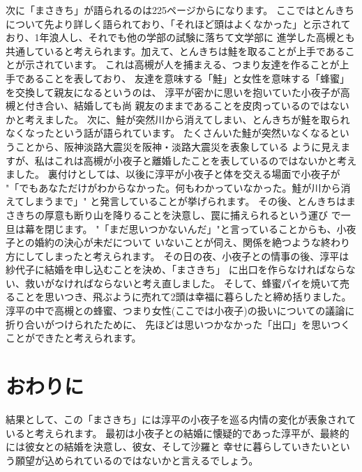 \documentclass[12pt,a4paper]{jsarticle}
\numberwithin{equation}{section}
\numberwithin{figure}{section}
\numberwithin{table}{section}
\begin{document}
次に「まさきち」が語られるのは225ページからになります。
ここではとんきちについて先より詳しく語られており、「それほど頭はよくなかった」と示されており、1年浪人し、それでも他の学部の試験に落ちて文学部に
進学した高槻とも共通していると考えられます。加えて、とんきちは鮭を取ることが上手であることが示されています。
これは高槻が人を捕まえる、つまり友達を作ることが上手であることを表しており、
友達を意味する「鮭」と女性を意味する「蜂蜜」を交換して親友になるというのは、
淳平が密かに思いを抱いていた小夜子が高槻と付き合い、結婚しても尚
親友のままであることを皮肉っているのではないかと考えました。
次に、鮭が突然川から消えてしまい、とんきちが鮭を取られなくなったという話が語られています。
たくさんいた鮭が突然いなくなるということから、阪神淡路大震災を阪神・淡路大震災を表象している
ように見えますが、私はこれは高槻が小夜子と離婚したことを表しているのではないかと考えました。
裏付けとしては、以後に淳平が小夜子と体を交える場面で小夜子が
"「でもあなただけがわからなかった。何もわかっていなかった。鮭が川から消えてしまうまで」"
と発言していることが挙げられます。
その後、とんきちはまさきちの厚意も断り山を降りることを決意し、罠に捕えられるという運び
で一旦は幕を閉じます。
"「まだ思いつかないんだ」"と言っていることからも、小夜子との婚約の決心が未だについて
いないことが伺え、関係を絶つような終わり方にしてしまったと考えられます。
その日の夜、小夜子との情事の後、淳平は紗代子に結婚を申し込むことを決め、「まさきち」
に出口を作らなければならない、救いがなければならないと考え直しました。
そして、蜂蜜パイを焼いて売ることを思いつき、飛ぶように売れて2頭は幸福に暮らしたと締め括りました。
淳平の中で高槻との蜂蜜、つまり女性(ここでは小夜子)の扱いについての議論に折り合いがつけられたために、
先ほどは思いつかなかった「出口」を思いつくことができたと考えられます。

\section{おわりに}
結果として、この「まさきち」には淳平の小夜子を巡る内情の変化が表象されていると考えられます。
最初は小夜子との結婚に懐疑的であった淳平が、最終的には彼女との結婚を決意し、彼女、そして沙羅と
幸せに暮らしていきたいという願望が込められているのではないかと言えるでしょう。
\end{document}
